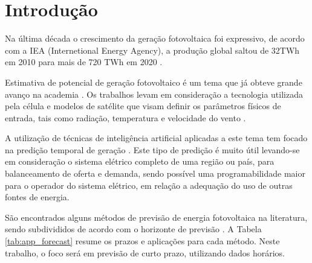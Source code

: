 \chapter{Introdução}
\label{cap:introducao}

Na última década o crescimento da geração fotovoltaica foi expressivo, de acordo com a IEA (Internetional Energy Agency), a produção global saltou de 32TWh em 2010 para mais de 720 TWh em 2020 \cite{ieasolarpvontrack2020}. 

Estimativa de potencial de geração fotovoltaico é um tema que já obteve grande avanço na academia \cite{chin2015cell, jordehi2016parameter, de2017performance}. Os trabalhos levam em consideração a tecnologia utilizada pela célula e modelos de satélite que visam definir os parâmetros físicos de entrada, tais como radiação, temperatura e velocidade do vento \cite{mueller2009cm, huld2012new, amillo2014new, habte2017evaluation}.

A utilização de técnicas de inteligência artificial aplicadas a este tema tem focado na predição temporal de geração \cite{voyant2017machine, wolff2016statistical, li2016hierarchical}. Este tipo de predição é muito útil levando-se em consideração o sistema elétrico completo de uma região ou país, para balanceamento de oferta e demanda, sendo possível uma programabilidade maior para o operador do sistema elétrico, em relação a adequação do uso de outras fontes de energia.

São encontrados alguns métodos de previsão de energia fotovoltaica na literatura, sendo subdivididos de acordo com o horizonte de previsão \cite{mellit2020advanced}. A Tabela \ref{tab:app_forecast} resume os prazos e aplicações para cada método. Neste trabalho, o foco será em previsão de curto prazo, utilizando dados horários.

